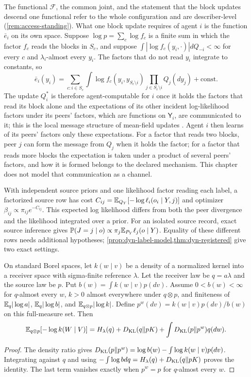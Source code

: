 The functional $\mathcal F$, the common joint, and the statement that the block updates descend one functional refer to the whole configuration and are describer-level (\cref{rem:access-standing}). What one block update requires of agent $i$ is the function $\bar e_i$ on its own space. Suppose $\log p=\sum_c\log f_c$ is a finite sum in which the factor $f_c$ reads the blocks in $S_c$, and suppose $\int|\log f_c(y_i,\cdot)|dQ_{-i}<\infty$ for every $c$ and $\lambda_i$-almost every $y_i$. The factors that do not read $y_i$ integrate to constants, so
\begin{equation}
 \bar e_i(y_i)=\sum_{c:i\in S_c}\int\log f_c(y_i,y_{S_c\setminus i})\prod_{j\in S_c\setminus i}Q_j(dy_j)+\mathrm{const}.
 \label{eq:dyn-incident-messages}
\end{equation}
The update $Q_i^*$ is therefore agent-computable for $i$ once it holds the factors that read its block alone and the expectations of its other incident log-likelihood factors under its peers' factors, which are functions on $\mathsf Y_i$, are communicated to it; this is the local message structure of mean-field updates \citep{Bishop2006}. Agent $i$ then learns of its peers' factors only these expectations. For a factor that reads two blocks, peer $j$ can form the message from $Q_j$ when it holds the factor; for a factor that reads more blocks the expectation is taken under a product of several peers' factors, and how it is formed belongs to the declared mechanism. This chapter does not model that communication as a channel.

With independent source priors and one likelihood factor reading each label, a factorized source row has cost $C_{ij}=\mathbb E_{Q_Y}[-\log\ell_i(o_i\mid Y,j)]$ and optimizer $\beta_{ij}\propto\pi_{ij}e^{-C_{ij}}$. This expected log likelihood differs from both the peer divergence and the likelihood integrated over a prior. For an isolated source record, exact source inference gives $\mathbb P(J=j\mid o)\propto\pi_j\mathbb E_{P_Y}\ell_j(o\mid Y)$. Equality of these different rows needs additional hypotheses; \cref{prop:dyn-label-model,thm:dyn-registered} give two exact settings.

On standard Borel spaces, let $k(w\mid v)$ be a density of a normalized kernel into a receiver space with sigma-finite reference $\lambda$. Let the receiver law be $q=a\lambda$ and the source law be $p$. Put $b(w)=\int k(w\mid v)p(dv)$. Assume $0<b(w)<\infty$ for $q$-almost every $w$, $k>0$ almost everywhere under $q\otimes p$, and finiteness of $\mathbb E_q|\log a|$, $\mathbb E_q|\log b|$, and $\mathbb E_{q\otimes p}|\log k|$. Define $p^w(dv)=k(w\mid v)p(dv)/b(w)$ on this full-measure set. Then
\begin{equation}
 \mathbb E_{q\otimes p}[-\log k(W\mid V)]
 =H_\lambda(q)+D_{\mathrm{KL}}(q\Vert pK)
   +\int D_{\mathrm{KL}}(p\Vert p^w)q(dw).
 \label{eq:dyn-jensen}
\end{equation}
\begin{proof}
The density ratio gives $D_{\mathrm{KL}}(p\Vert p^w)=\log b(w)-\int\log k(w\mid v)p(dv)$. Integrating against $q$ and using $-\int\log b dq=H_\lambda(q)+D_{\mathrm{KL}}(q\Vert pK)$ proves the identity. The last term vanishes exactly when $p^w=p$ for $q$-almost every $w$.
\end{proof}

